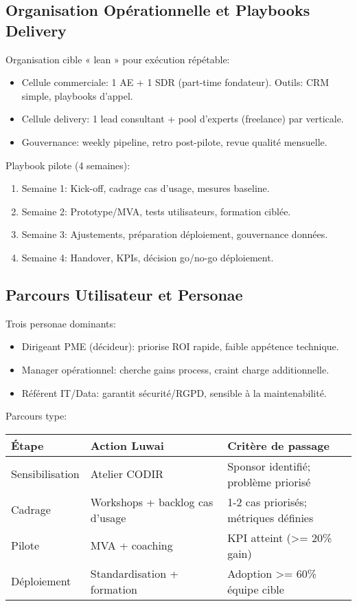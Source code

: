 \subsection{Organisation Opérationnelle et Playbooks Delivery}
Organisation cible « lean » pour exécution répétable:
\begin{itemize}
    \item Cellule commerciale: 1 AE + 1 SDR (part-time fondateur). Outils: CRM simple, playbooks d'appel.
    \item Cellule delivery: 1 lead consultant + pool d'experts (freelance) par verticale.
    \item Gouvernance: weekly pipeline, retro post-pilote, revue qualité mensuelle.
\end{itemize}
Playbook pilote (4 semaines):
\begin{enumerate}
    \item Semaine 1: Kick-off, cadrage cas d'usage, mesures baseline.
    \item Semaine 2: Prototype/MVA, tests utilisateurs, formation ciblée.
    \item Semaine 3: Ajustements, préparation déploiement, gouvernance données.
    \item Semaine 4: Handover, KPIs, décision go/no-go déploiement.
\end{enumerate}

\subsection{Parcours Utilisateur et Personae}
Trois personae dominants:
\begin{itemize}
    \item Dirigeant PME (décideur): priorise ROI rapide, faible appétence technique.
    \item Manager opérationnel: cherche gains process, craint charge additionnelle.
    \item Référent IT/Data: garantit sécurité/RGPD, sensible à la maintenabilité.
\end{itemize}
Parcours type:
\begin{longtable}{@{}p{3cm}p{5cm}p{6cm}@{}}
\toprule
\textbf{Étape} & \textbf{Action Luwai} & \textbf{Critère de passage} \\
\midrule
Sensibilisation & Atelier CODIR & Sponsor identifié; problème priorisé \\
Cadrage & Workshops + backlog cas d'usage & 1-2 cas priorisés; métriques définies \\
Pilote & MVA + coaching & KPI atteint (\textgreater{}= 20\% gain) \\
Déploiement & Standardisation + formation & Adoption \textgreater{}= 60\% équipe cible \\
\bottomrule
\end{longtable}

